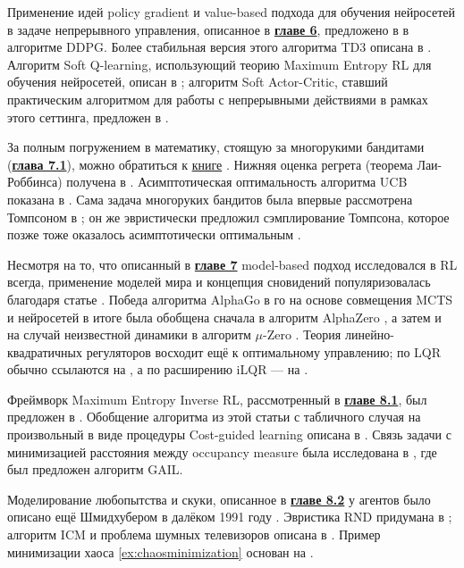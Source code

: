 Применение идей policy gradient и value-based подхода для обучения нейросетей в задаче непрерывного управления, описанное в \underline{\textbf{главе 6}}, предложено в \cite{lillicrap2015continuous} в алгоритме DDPG. Более стабильная версия этого алгоритма TD3 описана в \cite{fujimoto2018addressing}. Алгоритм Soft Q-learning, использующий теорию Maximum Entropy RL для обучения нейросетей, описан в \cite{haarnoja2017reinforcement}; алгоритм Soft Actor-Critic, ставший практическим алгоритмом для работы с непрерывными действиями в рамках этого сеттинга, предложен в \cite{haarnoja2018soft}. 

За полным погружением в математику, стоящую за многорукими бандитами (\underline{\textbf{глава 7.1}}), можно обратиться к \href{https://tor-lattimore.com/downloads/book/book.pdf}{книге} \cite{lattimore2020bandit}. Нижняя оценка регрета (теорема Лаи-Роббинса) получена в \cite{lai1985asymptotically}. Асимптотическая оптимальность алгоритма UCB показана в \cite{auer2002finite}. Сама задача многоруких бандитов была впервые рассмотрена Томпсоном в \cite{thompson1933likelihood}; он же эвристически предложил сэмплирование Томпсона, которое позже тоже оказалось асимптотически оптимальным \cite{kaufmann2012thompson}.

Несмотря на то, что описанный в \underline{\textbf{главе 7}} model-based подход исследовался в RL всегда, применение моделей мира и концепция сновидений популяризовалась благодаря статье \cite{ha2018world}. Победа алгоритма AlphaGo в го на основе совмещения MCTS и нейросетей в итоге была обобщена сначала в алгоритм AlphaZero \cite{silver2018general}, а затем и на случай неизвестной динамики в алгоритм $\mu$-Zero \cite{schrittwieser2019mastering}. Теория линейно-квадратичных регуляторов восходит ещё к оптимальному управлению; по LQR обычно ссылаются на \cite{bemporad2002explicit}, а по расширению iLQR --- на \cite{li2004iterative}.

Фреймворк Maximum Entropy Inverse RL, рассмотренный в \underline{\textbf{главе 8.1}}, был предложен в \cite{ziebart2008maximum}. Обобщение алгоритма из этой статьи с табличного случая на произвольный в виде процедуры Cost-guided learning описана в \cite{finn2016guided}. Связь задачи с минимизацией расстояния между occupancy measure была исследована в \cite{ho2016generative}, где был предложен алгоритм GAIL.

Моделирование любопытства и скуки, описанное в \underline{\textbf{главе 8.2}} у агентов было описано ещё Шмидхубером в далёком 1991 году \cite{schmidhuber1991possibility}. Эвристика RND придумана в \cite{burda2018exploration}; алгоритм ICM и проблема шумных телевизоров описана в \cite{pathak2017curiosity}. Пример минимизации хаоса \ref{ex:chaosminimization} основан на \cite{berseth2019smirl}.

